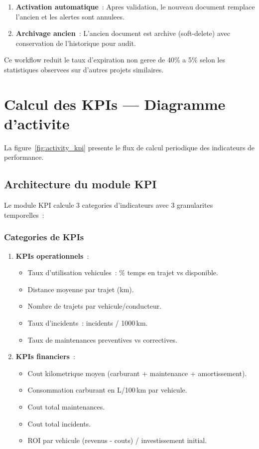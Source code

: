 \documentclass[12pt,a4paper]{report}
\begin{document}
\begin{enumerate}[leftmargin=2cm]
\begin{enumerate}[leftmargin=2cm]
  \item \textbf{Activation automatique}~: Apres validation, le nouveau
        document remplace l'ancien et les alertes sont annulees.
        
  \item \textbf{Archivage ancien}~: L'ancien document est archive (soft-delete)
        avec conservation de l'historique pour audit.
\end{enumerate}

Ce workflow reduit le taux d'expiration non geree de 40\% a 5\% selon
les statistiques observees sur d'autres projets similaires.

\section{Calcul des KPIs --- Diagramme d'activite}

La figure~\ref{fig:activity_kpi} presente le flux de calcul
periodique des indicateurs de performance.

\subsection{Architecture du module KPI}

Le module KPI calcule 3 categories d'indicateurs avec 3 granularites temporelles~:

\subsubsection{Categories de KPIs}

\begin{enumerate}[leftmargin=2cm]
  \item \textbf{KPIs operationnels}~:
        \begin{itemize}
          \item Taux d'utilisation vehicules~: \% temps en trajet vs disponible.
          \item Distance moyenne par trajet (km).
          \item Nombre de trajets par vehicule/conducteur.
          \item Taux d'incidents~: incidents / 1000\,km.
          \item Taux de maintenances preventives vs correctives.
        \end{itemize}
        
  \item \textbf{KPIs financiers}~:
        \begin{itemize}
          \item Cout kilometrique moyen (carburant + maintenance + amortissement).
          \item Consommation carburant en L/100\,km par vehicule.
          \item Cout total maintenances.
          \item Cout total incidents.
          \item ROI par vehicule (revenus - couts) / investissement initial.
        \end{itemize}
        

\end{enumerate}
\end{enumerate}
\end{document}
